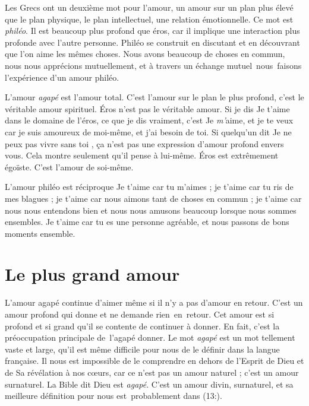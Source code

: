 Les Grecs ont un deuxième mot pour l'amour,
 un amour sur un plan plus élevé que le plan physique, le plan intellectuel,
 une relation émotionnelle. Ce mot est \emph{philéo}.
 Il est beaucoup plus profond que éros, car il implique une interaction
 plus profonde avec l'autre personne.
 Philéo se construit en discutant et en découvrant que l'on aime
 les mêmes choses. Nous avons beaucoup de choses en commun,
 nous nous apprécions mutuellement, et à travers un échange mutuel~nous~faisons
 l'expérience  d'un amour philéo.

L'amour \emph{agapé} est l'amour total.
 C'est l'amour sur le plan le plus profond, c'est le véritable amour spirituel.
 Éros n'est pas le véritable amour. Si je dis\frcolon{} \Og Je t'aime \Fg{}
 dans le domaine de l'éros, ce que je dis vraiment, c'est\frcolon{}
 \Og Je \emph{m'}aime, et je te veux car je suis amoureux de moi-même,
 et j'ai besoin de toi. \Fg{}
 Si quelqu'un dit\frcolon{} \Og Je ne peux pas vivre sans toi \Fg{},
 ça n'est pas une expression d'amour profond envers vous.
 Cela montre seulement qu'il pense à lui-même.
 Éros est extrêmement égoïste. C'est l'amour de soi-même.

L'amour philéo est réciproque\frcolon{} \Og Je t'aime car tu m'aimes ;
 je t'aime car tu ris de mes blagues ;
 je t'aime car nous aimons tant de choses en commun ;
 je t'aime car nous nous entendons bien et nous nous amusons beaucoup
 lorsque nous sommes ensembles. Je t'aime car
 tu es une personne agréable, et nous passons de bons moments ensemble. \Fg{}


\section{Le plus grand amour}

L'amour agapé continue d'aimer même si il n'y a pas d'amour en retour.
 C'est un amour profond qui donne et ne demande rien~en~retour.
 Cet amour est si profond et si grand qu'il se contente
 de continuer à donner.
 En fait, c'est la préoccupation principale de~l'agapé\frcolon{} donner.
 Le mot \emph{agapé} est un mot tellement vaste et large,
 qu'il est même difficile pour nous de le définir dans la langue française.
 Il nous est impossible de le comprendre en dehors de l'Esprit de Dieu
 et de Sa révélation à nos cœurs, car ce n'est pas un amour naturel ;
 c'est un amour surnaturel.
 La Bible dit\frcolon{} \Og Dieu est \emph{agapé}. \Fg{}
 C'est un amour divin, surnaturel, et sa meilleure définition pour nous
 est~probablement dans (13:).

